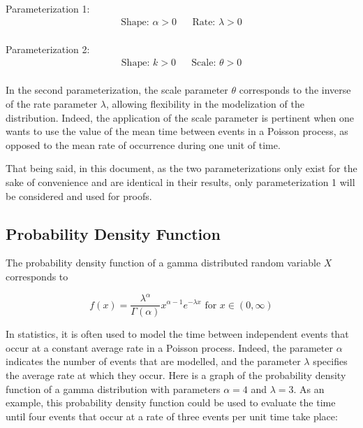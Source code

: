 \documentclass[12pt]{article}
\begin{document}
\noindent Parameterization 1:\vspace*{-24pt}
\begin{align*}
	\text{Shape: } \alpha>0		&&	\text{Rate: }\lambda>0
\end{align*}\\[-60pt]

\noindent Parameterization 2:\vspace*{-24pt}
\begin{align*}
	\text{Shape: } k>0			&&	\text{Scale: }\theta>0
\end{align*}\\[-60pt]

In the second parameterization, the scale parameter $\theta$ corresponds to the inverse of the rate parameter $\lambda$,
allowing flexibility in the modelization of the distribution. Indeed, the application of the scale parameter is
pertinent when one wants to use the value of the mean time between events in a Poisson process, as
opposed to the mean rate of occurrence during one unit of time.

That being said, in this document, as the two parameterizations only exist for the sake of convenience and are identical
in their results, only parameterization 1 will be considered and used for proofs.


\pagebreak
\subsection{Probability Density Function}\label{subsec:gamma:pdf}
The probability density function of a gamma distributed random variable $X$ corresponds to

\begin{equation}\label{eq:gamma:pdf}
	f(x) = \frac{\lambda^\alpha}{\Gamma(\alpha)}x^{\alpha-1}e^{-\lambda x}\text{ for }x\in (0, \infty)
\end{equation}

In statistics, it is often used to model the time between independent events that occur at a constant average rate in a
Poisson process. Indeed, the parameter $\alpha$ indicates the number of events that are modelled, and the parameter
$\lambda$ specifies the average rate at which they occur. Here is a graph of the probability density function of a gamma
distribution with parameters $\alpha=4$ and $\lambda=3$. As an example, this probability density function could be used
to evaluate the time until four events that occur at a rate of three events per unit time take place:
\end{document}
